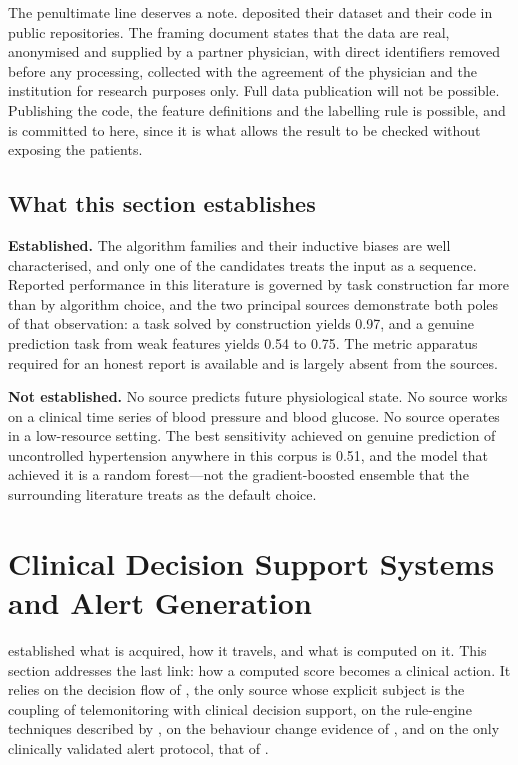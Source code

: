 \documentclass[12pt,a4paper,oneside]{report}
\begin{document}
The penultimate line deserves a note. \Textcite{mendoza2025} deposited their dataset and their code in public repositories. The framing document states that the data are real, anonymised and supplied by a partner physician, with direct identifiers removed before any processing, collected with the agreement of the physician and the institution for research purposes only. Full data publication will not be possible. Publishing the code, the feature definitions and the labelling rule is possible, and is committed to here, since it is what allows the result to be checked without exposing the patients.

\subsection{What this section establishes}\label{sec:ml-conclusion}

\textbf{Established.} The algorithm families and their inductive biases are well characterised, and only one of the candidates treats the input as a sequence. Reported performance in this literature is governed by task construction far more than by algorithm choice, and the two principal sources demonstrate both poles of that observation: a task solved by construction yields 0.97, and a genuine prediction task from weak features yields 0.54 to 0.75. The metric apparatus required for an honest report is available and is largely absent from the sources.

\textbf{Not established.} No source predicts future physiological state. No source works on a clinical time series of blood pressure and blood glucose. No source operates in a low-resource setting. The best sensitivity achieved on genuine prediction of uncontrolled hypertension anywhere in this corpus is 0.51, and the model that achieved it is a random forest---not the gradient-boosted ensemble that the surrounding literature treats as the default choice.

\section{Clinical Decision Support Systems and Alert Generation}\label{sec:cdss}

 established what is acquired, how it travels, and what is computed on it. This section addresses the last link: how a computed score becomes a clinical action. It relies on the decision flow of \textcite{yazdani2018}, the only source whose explicit subject is the coupling of telemonitoring with clinical decision support, on the rule-engine techniques described by \textcite{liu2025review}, on the behaviour change evidence of \textcite{zhou2024}, and on the only clinically validated alert protocol, that of \textcite{mihevc2025}.
\end{document}
